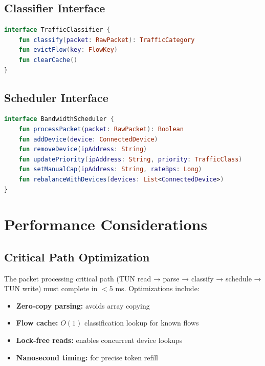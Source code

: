 \subsection{Classifier Interface}

\begin{lstlisting}[language=Kotlin, caption={Classifier Interface}, label={lst:classifier-interface}]
interface TrafficClassifier {
    fun classify(packet: RawPacket): TrafficCategory
    fun evictFlow(key: FlowKey)
    fun clearCache()
}
\end{lstlisting}

\subsection{Scheduler Interface}

\begin{lstlisting}[language=Kotlin, caption={Scheduler Interface}, label={lst:scheduler-interface}]
interface BandwidthScheduler {
    fun processPacket(packet: RawPacket): Boolean
    fun addDevice(device: ConnectedDevice)
    fun removeDevice(ipAddress: String)
    fun updatePriority(ipAddress: String, priority: TrafficClass)
    fun setManualCap(ipAddress: String, rateBps: Long)
    fun rebalanceWithDevices(devices: List<ConnectedDevice>)
}
\end{lstlisting}

\section{Performance Considerations}
\label{sec:performance-design}

\subsection{Critical Path Optimization}

The packet processing critical path (TUN read → parse → classify → schedule → TUN write) must complete in $<5$ ms. Optimizations include:

\begin{itemize}[leftmargin=*]
    \item \textbf{Zero-copy parsing:}  avoids array copying
    \item \textbf{Flow cache:} $O(1)$ classification lookup for known flows
    \item \textbf{Lock-free reads:}  enables concurrent device lookups
    \item \textbf{Nanosecond timing:}  for precise token refill
\end{itemize}

